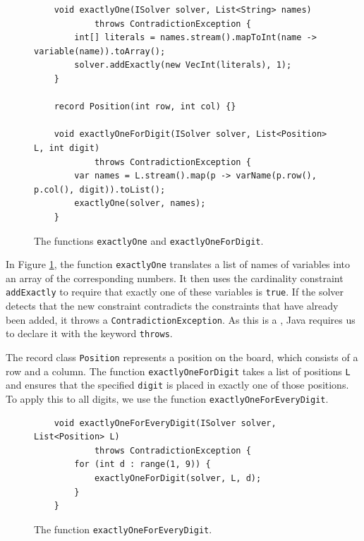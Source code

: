 \begin{figure}[!ht]
  \centering
\begin{verbatim}
    void exactlyOne(ISolver solver, List<String> names)
            throws ContradictionException {
        int[] literals = names.stream().mapToInt(name -> variable(name)).toArray();
        solver.addExactly(new VecInt(literals), 1);
    }

    record Position(int row, int col) {}

    void exactlyOneForDigit(ISolver solver, List<Position> L, int digit)
            throws ContradictionException {
        var names = L.stream().map(p -> varName(p.row(), p.col(), digit)).toList();
        exactlyOne(solver, names);
    }
\end{verbatim}
\vspace*{-0.3cm}
  \caption{The functions \texttt{exactlyOne} and \texttt{exactlyOneForDigit}.}
  \label{fig:sat4j-exactlyOneForDigit}
\end{figure}

\noindent
In Figure \ref{fig:sat4j-exactlyOneForDigit}, the function \texttt{exactlyOne} translates a list of
names of variables into an array of the corresponding numbers.  It then uses the cardinality constraint
\texttt{addExactly} to require that exactly one of these variables is \texttt{true}.  If the solver detects that
the new constraint contradicts the constraints that have already been added, it throws a
\texttt{ContradictionException}.  As this is a , Java requires us to declare it with the
keyword \texttt{throws}.

The record class \texttt{Position} represents a position on the board, which consists of a row and a column.  The
function \texttt{exactlyOneForDigit} takes a list of positions \texttt{L} and ensures that the specified
\texttt{digit} is placed in exactly one of those positions.  To apply this to all digits, we use the function
\texttt{exactlyOneForEveryDigit}.

\begin{figure}[!ht]
  \centering
\begin{verbatim}
    void exactlyOneForEveryDigit(ISolver solver, List<Position> L)
            throws ContradictionException {
        for (int d : range(1, 9)) {
            exactlyOneForDigit(solver, L, d);
        }
    }
\end{verbatim}
\vspace*{-0.3cm}
  \caption{The function \texttt{exactlyOneForEveryDigit}.}
  \label{fig:sat4j-exactlyOneForEveryDigit}
\end{figure}

